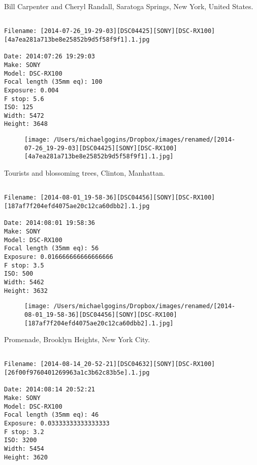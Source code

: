 \clearpage
\onecolumn
\noindent Bill Carpenter and Cheryl Randall, Saratoga Springs, New York, United States.
\noindent
\begin{lstlisting}

Filename: [2014-07-26_19-29-03][DSC04425][SONY][DSC-RX100][4a7ea281a713be8e25852b9d5f58f9f1].1.jpg

Date: 2014:07:26 19:29:03
Make: SONY
Model: DSC-RX100
Focal length (35mm eq): 100
Exposure: 0.004
F stop: 5.6
ISO: 125
Width: 5472
Height: 3648
\end{lstlisting}
\clearpage

\begin{figure}
\texttt{[image: /Users/michaelgogins/Dropbox/images/renamed/[2014-07-26\_19-29-03][DSC04425][SONY][DSC-RX100][4a7ea281a713be8e25852b9d5f58f9f1].1.jpg]}
\end{figure}
    
\clearpage
\onecolumn
\noindent Tourists and blossoming trees, Clinton, Manhattan.
\noindent
\begin{lstlisting}

Filename: [2014-08-01_19-58-36][DSC04456][SONY][DSC-RX100][187af7f204efd4075ae20c12ca60dbb2].1.jpg

Date: 2014:08:01 19:58:36
Make: SONY
Model: DSC-RX100
Focal length (35mm eq): 56
Exposure: 0.016666666666666666
F stop: 3.5
ISO: 500
Width: 5462
Height: 3632
\end{lstlisting}
\clearpage

\begin{figure}
\texttt{[image: /Users/michaelgogins/Dropbox/images/renamed/[2014-08-01\_19-58-36][DSC04456][SONY][DSC-RX100][187af7f204efd4075ae20c12ca60dbb2].1.jpg]}
\end{figure}
    
\clearpage
\onecolumn
\noindent Promenade, Brooklyn Heights, New York City.
\noindent
\begin{lstlisting}

Filename: [2014-08-14_20-52-21][DSC04632][SONY][DSC-RX100][26f00f9760401269963a1c3b62c83b5e].1.jpg

Date: 2014:08:14 20:52:21
Make: SONY
Model: DSC-RX100
Focal length (35mm eq): 46
Exposure: 0.03333333333333333
F stop: 3.2
ISO: 3200
Width: 5454
Height: 3620
\end{lstlisting}
\clearpage

